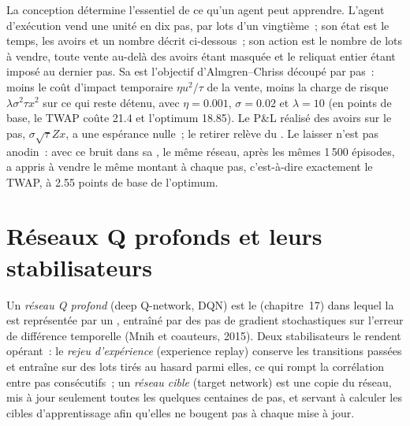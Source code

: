 La conception détermine l'essentiel de ce qu'un agent peut apprendre. L'agent d'exécution vend une unité en dix pas, par lots d'un vingtième~;
son état est le temps, les avoirs et un nombre décrit ci-dessous~; son action est le nombre de lots à vendre, toute vente
au-delà des avoirs étant masquée et le reliquat entier étant imposé au dernier pas. Sa  est l'objectif d'Almgren--Chriss
découpé par pas~: moins le coût d'impact temporaire $\eta u^2/\tau$ de la vente, moins la charge de risque $\lambda\sigma^2\tau x^2$ sur
ce qui reste détenu, avec $\eta = 0.001$, $\sigma = 0.02$ et $\lambda = 10$ (en points de base, le TWAP coûte 21.4 et l'optimum
18.85). Le P\&L réalisé des avoirs sur le pas, $\sigma\sqrt\tau Z x$, a une espérance nulle~; le retirer relève
du . Le laisser n'est pas anodin~: avec ce bruit dans sa , le même réseau, après les mêmes 1\,500
épisodes, a appris à vendre le même montant à chaque pas, c'est-à-dire exactement le TWAP, à 2.55 points de base de l'optimum.

\section{Réseaux Q profonds et leurs stabilisateurs}

\begin{definition}\label{def:ml:reinforcement-learning-for-execution-and-market-making:dqn}
Un \emph{réseau Q profond} (deep Q-network, DQN) est le  (chapitre~17) dans lequel la  est représentée par
un , entraîné par des pas de gradient stochastiques sur l'erreur de différence temporelle (Mnih et coauteurs, 2015). Deux
stabilisateurs le rendent opérant~: le \emph{rejeu d'expérience} (experience replay) conserve les transitions passées et entraîne sur des lots tirés au hasard
parmi elles, ce qui rompt la corrélation entre pas consécutifs~; un \emph{réseau cible} (target network) est une copie du
réseau, mis à jour seulement toutes les quelques centaines de pas, et servant à calculer les cibles d'apprentissage afin qu'elles ne bougent pas à chaque
mise à jour.
\end{definition}

